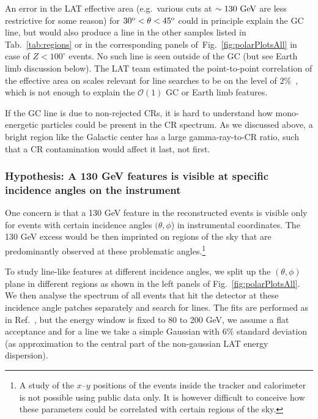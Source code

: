 \documentclass[aps,twocolumn,prd,superscriptaddress,showpacs,nofootinbib,fixfloat]{revtex4}
\newcommand{\GeV}{{\rm ~GeV}}
\newcommand{\degree}{^{\rm o}}
\begin{document}
An error in the LAT effective area (e.g.~various cuts at $\sim130\GeV$ are
less restrictive for some reason) for $30\degree < \theta < 45\degree$ could
in principle explain the GC line, but would also produce a line in the other
samples listed in Tab.~\ref{tab:regions} or in the corresponding panels
of~Fig.~\ref{fig:polarPlotsAll} in case of $Z<100^\circ$ events. No such line
is seen outside of the GC (but see Earth limb discussion below). The LAT team
estimated the point-to-point correlation of the effective area on scales
relevant for line searches to be on the level of $2\%$~\cite{performance},
which is not enough to explain the $\mathcal{O}(1)$ GC or Earth limb features.

If the GC line is due to non-rejected CRs, it is hard to understand how
mono-energetic particles could be present in the CR spectrum. As we discussed
above, a bright region like the Galactic center has a large gamma-ray-to-CR
ratio, such that a CR contamination would affect it last, not first.

\subsubsection{Hypothesis: A 130 GeV features is visible
at specific incidence angles on the instrument}


One concern is that a 130 GeV feature in the
reconstructed events is visible only for events with certain
incidence angles $(\theta, \phi$) in instrumental
coordinates. The 130 GeV excess would be then imprinted on
regions of the sky that are predominantly observed at
these problematic angles.\footnote{A study of the
$x$--$y$ positions of the events inside the tracker and calorimeter
is not possible using public data only.
It is however difficult to conceive how these 
parameters could be correlated with certain regions of the
sky.}

To study line-like features at different incidence
angles, we split up the $(\theta, \phi)$ plane in different
regions as shown in the left panels of
Fig.~\ref{fig:polarPlotsAll}. We then analyse the spectrum
of all events that hit the detector at these incidence
angle patches separately and search for lines. The fits are
performed as in Ref.~\cite{Weniger:2012}, but the energy
window is fixed to 80 to 200 GeV, we assume a flat
acceptance and for a line we take a simple Gaussian with $6\%$
standard deviation (as approximation to the central part of the non-gaussian
LAT energy dispersion).
\end{document}
